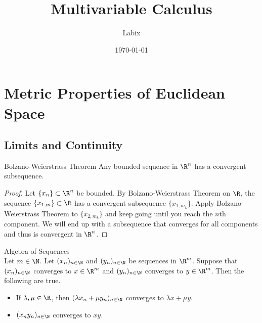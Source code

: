 \documentclass[a4paper]{article}
\title{Multivariable Calculus}
\author{Labix}
\date{\today}
\begin{document}
\maketitle
\pagebreak
\tableofcontents
\pagebreak

\section{Metric Properties of Euclidean Space}
\subsection{Limits and Continuity}
\begin{thm}{Bolzano-Weierstrass Theorem}{} Any bounded sequence in $\R^n$ has a convergent subsequence. 
\begin{proof} Let $\{x_n\}\subset\R^n$ be bounded. By Bolzano-Weierstrass Theorem on $\R$, the sequence $\{x_{1,m}\}\subset\R$ has a convergent subsequence $\{x_{1,m_k}\}$. Apply Bolzano-Weierstrass Theorem to $\{x_{2,m_k}\}$ and keep going until you reach the $n$th component. We will end up with a subsequence that converges for all components and thus is convergent in $\R^n$. 
\end{proof}
\end{thm}

\begin{prp}{Algebra of Sequences}{}\\
Let $m\in\N$. Let $(x_n)_{n\in\N}$ and $(y_n)_{n\in\N}$ be sequences in $\R^m$. Suppose that $(x_n)_{n\in\N}$ converges to $x\in\R^m$ and $(y_n)_{n\in\N}$ converges to $y\in\R^m$. Then the following are true. 
\begin{itemize}
\item If $\lambda,\mu\in\R$, then $(\lambda x_n+\mu y_n)_{n\in\N}$ converges to $\lambda x+\mu y$. 
\item $(x_ny_n)_{n\in\N}$ converges to $xy$. 
\end{itemize}
\end{prp}
\end{document}
